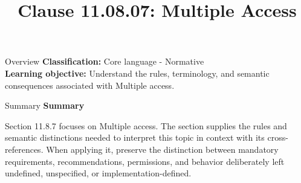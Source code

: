 \documentclass[10pt,letterpaper]{article}
\title{Clause 11.08.07: Multiple Access}
\author{}
\date{}
\begin{document}
\maketitle
\begin{CornellOverviewBox}{Overview}
\textbf{Classification:} Core language - Normative\\[2pt]
\textbf{Learning objective:} Understand the rules, terminology, and semantic consequences associated with Multiple access.
\end{CornellOverviewBox}\begin{CornellSummaryBox}{Summary}
{\sffamily\bfseries\color{Accent} Summary}\par\vspace{3pt}Section 11.8.7 focuses on Multiple access. The section supplies the rules and semantic distinctions needed to interpret this topic in context with its cross-references. When applying it, preserve the distinction between mandatory requirements, recommendations, permissions, and behavior deliberately left undefined, unspecified, or implementation-defined.
\end{CornellSummaryBox}
\end{document}
